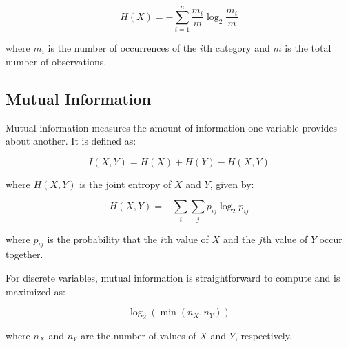 \documentclass[a4paper,12pt]{article}
\begin{document}
\[ H(X) = - \sum_{i=1}^{n} \frac{m_i}{m} \log_2 \frac{m_i}{m} \]

where \( m_i \) is the number of occurrences of the \( i \)th category and \( m \) is the total number of observations.

\subsection{Mutual Information}
Mutual information measures the amount of information one variable provides about another. It is defined as:

\[ I(X,Y) = H(X) + H(Y) - H(X,Y) \]

where \( H(X,Y) \) is the joint entropy of \( X \) and \( Y \), given by:

\[ H(X,Y) = - \sum_{i} \sum_{j} p_{ij} \log_2 p_{ij} \]

where \( p_{ij} \) is the probability that the \( i \)th value of \( X \) and the \( j \)th value of \( Y \) occur together.

For discrete variables, mutual information is straightforward to compute and is maximized as:

\[ \log_2(\min(n_X, n_Y)) \]

where \( n_X \) and \( n_Y \) are the number of values of \( X \) and \( Y \), respectively.
\end{document}
